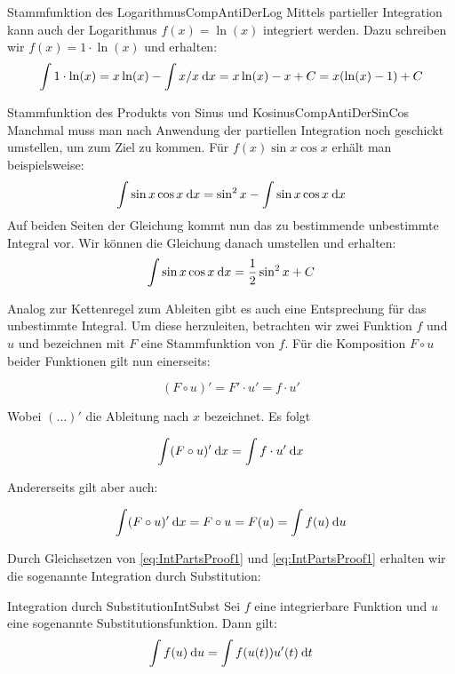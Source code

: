 \begin{example}{Stammfunktion des Logarithmus}{CompAntiDerLog}
    Mittels partieller Integration kann auch der Logarithmus $f(x) = \ln(x)$ integriert werden. Dazu schreiben wir $f(x) = 1 \cdot \ln(x)$ und erhalten:
    $$
        \int 1\cdot\ln(x) = x\ln(x) - \int x/x \:\mathrm{d}{x} = x\ln(x)-x+C = x (\ln(x) - 1) + C
    $$
\end{example}

\begin{example}{Stammfunktion des Produkts von Sinus und Kosinus}{CompAntiDerSinCos}
    Manchmal muss man nach Anwendung der partiellen Integration noch geschickt umstellen, um zum Ziel zu kommen. Für $f(x) \sin x\cos x$ erhält man beispielsweise:
    $$
        \int \sin x \cos x \:\mathrm{d}{x} = \sin^2 x - \int \sin x \cos x \:\mathrm{d}{x}
    $$
    Auf beiden Seiten der Gleichung kommt nun das zu bestimmende unbestimmte Integral vor. Wir können die Gleichung danach umstellen und erhalten:
    $$
        \int \sin x \cos x \:\mathrm{d}{x} = \frac{1}{2} \sin^2 x + C
    $$
\end{example}

Analog zur Kettenregel zum Ableiten gibt es auch eine Entsprechung für das unbestimmte Integral. Um diese herzuleiten, betrachten wir zwei Funktion $f$ und $u$ und bezeichnen mit $F$ eine Stammfunktion von $f$. Für die Komposition $F \circ u$ beider Funktionen gilt nun einerseits:

$$
    (F\circ u)' = F' \cdot u' = f \cdot u'
$$

Wobei $(\dots)'$ die Ableitung nach $x$ bezeichnet. Es folgt

\begin{equation}
    \int (F \circ u)' \:\mathrm{d}{x} = \int f \cdot u' \:\mathrm{d}{x} \label{eq:IntPartsProof1}
\end{equation}

Andererseits gilt aber auch:

\begin{equation}
    \int (F \circ u)' \:\mathrm{d}{x} = F \circ u = F(u) = \int f(u) \:\mathrm{d}{u} \label{eq:IntPartsProof2}
\end{equation}

Durch Gleichsetzen von \ref{eq:IntPartsProof1} und \ref{eq:IntPartsProof1} erhalten wir die sogenannte Integration durch Substitution:

\begin{statement}{Integration durch Substitution}{IntSubst}
    Sei $f$ eine integrierbare Funktion und $u$ eine sogenannte Substitutionsfunktion. Dann gilt:
    $$
        \int f(u) \:\mathrm{d}{u} = \int f(u(t)) u'(t) \:\mathrm{d}{t}
    $$
\end{statement}

